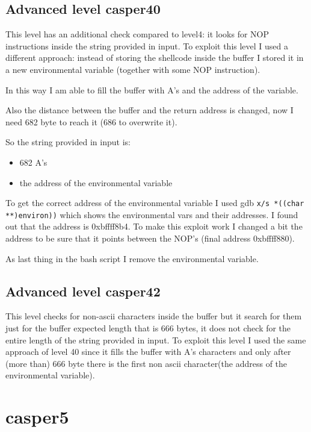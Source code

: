 \documentclass[a4paper,12pt]{article}
\begin{document}
\subsection{Advanced level casper40}

This level has an additional check compared to level4: it looks for NOP instructions inside the string provided in input. To exploit this level I used a different approach: instead of storing the shellcode inside the buffer I stored it in a new environmental variable (together with some NOP instruction).  

In this way I am able to fill the buffer with A's and the address of the variable.

Also the distance between the buffer and the return address is changed, now I need 682 byte to reach it (686 to overwrite it).

So the string provided in input is:
\begin{itemize}
\item 682 A's
\item the address of the environmental variable
\end{itemize}

To get the correct address of the environmental variable I used gdb \texttt{x/s *((char **)environ))} which shows the environmental vars and their addresses. I found out that the address is 0xbffff8b4. To make this exploit work I changed a bit the address to be sure that it points between the NOP's (final address 0xbffff880).

As last thing in the bash script I remove the environmental variable.

\subsection{Advanced level casper42}

This level checks for non-ascii characters inside the buffer but it search for them just for the buffer expected length that is 666 bytes, it does not check for the entire length of the string provided in input. To exploit this level I used the same approach of level 40 since it fills the buffer with A's characters and only after (more than) 666 byte there is the first non ascii character(the address of the environmental variable).

\section{casper5}
\end{document}

